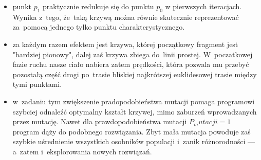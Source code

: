 \documentclass{classrep}
\begin{document}
\begin{itemize}
  \item punkt $p_1$ praktycznie redukuje się do punktu $p_0$ w pierwszych iteracjach. Wynika z~tego, że~taką krzywą można równie skutecznie reprezentować za~pomocą jednego tylko punktu charakterystycznego.
  \item za każdym razem efektem jest krzywa, której początkowy fragment jest "bardziej pionowy", dalej zaś krzywa zbiega do~linii prostej. W~poczatkowej fazie ruchu nasze ciało nabiera zatem prędkości, która pozwala mu przebyć pozostałą część drogi po~trasie bliskiej najkrótszej euklidesowej trasie między tymi punktami.
  \item w~zadaniu tym zwiększenie pradopodobieństwa mutacji pomaga programowi szybciej odnaleźć optymalny kształt krzywej, mimo zaburzeń wprowadzanych przez mutację. Nawet dla prawdopodobieństwa mutacji $P_mutacji=1$ program dąży do podobnego rozwiązania. Zbyt mała mutacja powoduje zaś szybkie uśrednienie wszystkich osobników populacji i~zanik różnorodności --- a~zatem i~eksplorowania nowych rozwiązań.
\end{itemize}
\end{document}
